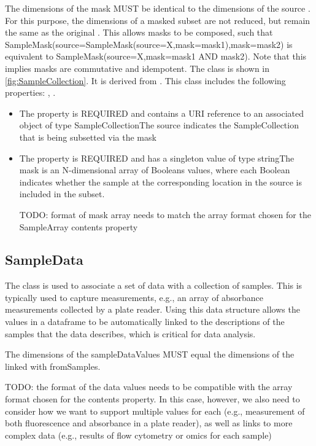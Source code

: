         The dimensions of the mask MUST be identical to the dimensions of the source . For this purpose,
        the dimensions of a masked subset are not reduced, but remain the same as the original . This allows
        masks to be composed, such that SampleMask(source=SampleMask(source=X,mask=mask1),mask=mask2) is equivalent to
        SampleMask(source=X,mask=mask1 AND mask2). Note that this implies masks are commutative and idempotent.%
\newline%
\linebreak%
The  class is shown in \ref{fig:SampleCollection}. It is derived from .%
This class includes the following properties: , . %
\begin{itemize}%
\item%
The  property is REQUIRED and contains a URI reference to an associated object of type SampleCollectionThe source indicates the SampleCollection that is being subsetted via the mask%
\item%
The  property is REQUIRED and has a singleton value of type stringThe mask is an N-dimensional array of Booleans values, where each Boolean indicates whether the
        sample at the corresponding location in the source is included in the subset.

        TODO: format of mask array needs to match the array format chosen for the SampleArray contents property%
\end{itemize}%
\subsection{SampleData}%
\label{sec:paml:SampleData}%
The  class is used to associate a set of data with a collection of samples.
        This is typically used to capture measurements, e.g., an array of absorbance measurements collected by
        a plate reader. Using this data structure allows the values in a dataframe to be automatically linked to
        the descriptions of the samples that the data describes, which is critical for data analysis.

        The dimensions of the sampleDataValues MUST equal the dimensions of the  linked with fromSamples.

        TODO: the format of the data values needs to be compatible with the array format chosen for the
         contents property. In this case, however, we also need to consider how we want to support
        multiple values for each  (e.g., measurement of both fluorescence and absorbance in a plate reader),
        as well as links to more complex data (e.g., results of flow cytometry or omics for each sample)%
\newline%
\linebreak%


